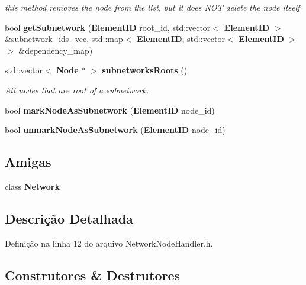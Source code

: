 \begin{DoxyCompactItemize}
\begin{DoxyCompactList}\small\item\em this method removes the node from the list, but it does N\+OT delete the node itself \end{DoxyCompactList}\item 
bool {\bf get\+Subnetwork} ({\bf Element\+ID} root\+\_\+id, std\+::vector$<$ {\bf Element\+ID} $>$ \&subnetwork\+\_\+ids\+\_\+vec, std\+::map$<$ {\bf Element\+ID}, std\+::vector$<$ {\bf Element\+ID} $>$ $>$ \&dependency\+\_\+map)
\item 
std\+::vector$<$ {\bf Node} $\ast$ $>$ {\bf subnetworks\+Roots} ()
\begin{DoxyCompactList}\small\item\em All nodes that are root of a subnetwork. \end{DoxyCompactList}\item 
bool {\bf mark\+Node\+As\+Subnetwork} ({\bf Element\+ID} node\+\_\+id)
\item 
bool {\bf unmark\+Node\+As\+Subnetwork} ({\bf Element\+ID} node\+\_\+id)
\end{DoxyCompactItemize}
\subsection*{Amigas}
\begin{DoxyCompactItemize}
\item 
class {\bf Network}
\end{DoxyCompactItemize}


\subsection{Descrição Detalhada}


Definição na linha 12 do arquivo Network\+Node\+Handler.\+h.



\subsection{Construtores \& Destrutores}
